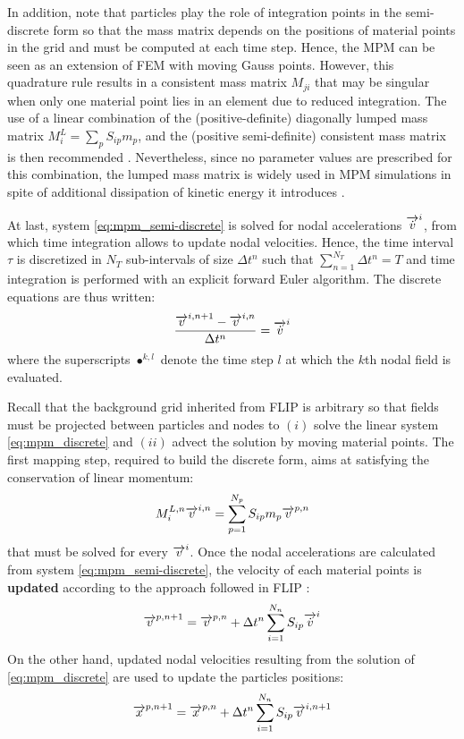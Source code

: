 In addition, note that particles play the role of integration points in the semi-discrete form so that the mass matrix depends on the positions of material points in the grid and must be computed at each time step. Hence, the MPM can be seen as an extension of FEM with moving Gauss points. However, this quadrature rule results in a consistent mass matrix $M_{ji}$ that may be singular when only one material point lies in an element due to reduced integration. The use of a linear combination of the (positive-definite) diagonally lumped mass matrix $M^L_i=\sum_p S_{ip}m_p$, and the (positive semi-definite) consistent mass matrix is then recommended \cite{Love}. Nevertheless, since no parameter values are prescribed for this combination, the lumped mass matrix is widely used in MPM simulations in spite of additional dissipation of kinetic energy it introduces \cite{Mass_Flip}. 

At last, system \eqref{eq:mpm_semi-discrete} is solved for nodal accelerations ${\overrightarrow{\dot{v}}}^i$, from which time integration allows to update nodal velocities. Hence, the time interval $\tau$ is discretized in $N_T$ sub-intervals of size $\Delta t^n$ such that $\sum_{n=1}^{N_T} \Delta t^n = T$ and time integration is performed with an explicit forward Euler algorithm. The discrete equations are thus written:
\begin{equation}
  \label{eq:mpm_discrete}
  \frac{{\overrightarrow{v}}^{i,n+1}-{\overrightarrow{v}}^{i,n}}{\Delta t^n} = {\overrightarrow{\dot{v}}}^i
\end{equation}
where the superscripts $\bullet^{k,l}$ denote the time step $l$ at which the $k$th nodal field is evaluated. 

Recall that the background grid inherited from FLIP is arbitrary so that fields must be projected between particles and nodes to $(i)$ solve the linear system \eqref{eq:mpm_discrete} and $(ii)$ advect the solution by moving material points. The first mapping step, required to build the discrete form, aims at satisfying the conservation of linear momentum:
\begin{equation}
  \label{eq:particles2nodes}
  M^{L,n}_i {\overrightarrow{v}}^{i,n} = \sum_{p=1}^{N_p} S_{ip}m_p {\overrightarrow{v}}^{p,n}
\end{equation}
that must be solved for every ${\overrightarrow{v}}^i$. Once the nodal accelerations are calculated from system \eqref{eq:mpm_semi-discrete}, the velocity of each material points is \textbf{updated} according to the approach followed in FLIP \cite{PIC_Nishiguchi}:
\begin{equation}
  \label{eq:mp_velocity_update}
  {\overrightarrow{v}}^{p,n+1}= {\overrightarrow{v}}^{p,n}+ \Delta t^n \sum_{i=1}^{N_n} S_{ip}{\overrightarrow{\dot{v}}}^{i}
\end{equation}
On the other hand, updated nodal velocities resulting from the solution of \eqref{eq:mpm_discrete} are used to update the particles positions:
\begin{equation}
  \label{eq:position_update}
  {\overrightarrow{x}}^{p,n+1}={\overrightarrow{x}}^{p,n} + \Delta t^n\sum_{i=1}^{N_n} S_{ip}{\overrightarrow{v}}^{i,n+1} 
\end{equation}

